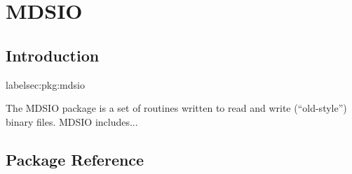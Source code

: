

\section{MDSIO}
\label{sec:mdsio}
\label{sec:pkg:mdsio}

\subsection{Introduction}
label{sec:pkg:mdsio}

The MDSIO package is a set of routines written to read and write
(``old-style'') binary files.  MDSIO includes...


\subsection{Package Reference}

